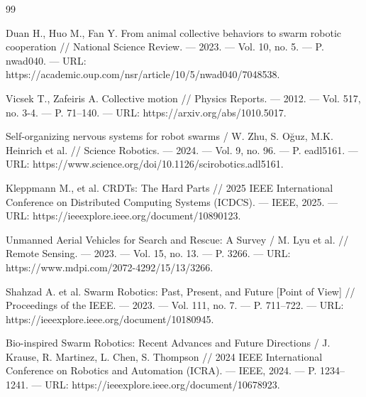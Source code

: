 \documentclass[12pt, a4paper]{article}
\begin{document}
\begin{thebibliography}{99}

Duan H., Huo M., Fan Y. From animal collective behaviors to swarm robotic cooperation // National Science Review. — 2023. — Vol. 10, no. 5. — P. nwad040. — URL: https://academic.oup.com/nsr/article/10/5/nwad040/7048538.

Vicsek T., Zafeiris A. Collective motion // Physics Reports. — 2012. — Vol. 517, no. 3-4. — P. 71–140. — URL: https://arxiv.org/abs/1010.5017.

Self-organizing nervous systems for robot swarms / W. Zhu, S. Oğuz, M.K. Heinrich et al. // Science Robotics. — 2024. — Vol. 9, no. 96. — P. eadl5161. — URL: https://www.science.org/doi/10.1126/scirobotics.adl5161.

Kleppmann M., et al. CRDTs: The Hard Parts // 2025 IEEE International Conference on Distributed Computing Systems (ICDCS). — IEEE, 2025. — URL: https://ieeexplore.ieee.org/document/10890123.

Unmanned Aerial Vehicles for Search and Rescue: A Survey / M. Lyu et al. // Remote Sensing. — 2023. — Vol. 15, no. 13. — P. 3266. — URL: https://www.mdpi.com/2072-4292/15/13/3266.

Shahzad A. et al. Swarm Robotics: Past, Present, and Future [Point of View] // Proceedings of the IEEE. — 2023. — Vol. 111, no. 7. — P. 711–722. — URL: https://ieeexplore.ieee.org/document/10180945.

Bio-inspired Swarm Robotics: Recent Advances and Future Directions / J. Krause, R. Martinez, L. Chen, S. Thompson // 2024 IEEE International Conference on Robotics and Automation (ICRA). — IEEE, 2024. — P. 1234–1241. — URL: https://ieeexplore.ieee.org/document/10678923.

\end{thebibliography}
\end{document}

